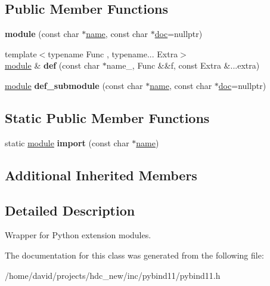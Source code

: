\subsection*{Public Member Functions}
\begin{DoxyCompactItemize}
\item 
{\bfseries module} (const char $\ast$\hyperlink{structname}{name}, const char $\ast$\hyperlink{structdoc}{doc}=nullptr)\hypertarget{classmodule_abd798017921903073343c4479efb93c0}{}\label{classmodule_abd798017921903073343c4479efb93c0}

\item 
{\footnotesize template$<$typename Func , typename... Extra$>$ }\\\hyperlink{classmodule}{module} \& {\bfseries def} (const char $\ast$name\+\_\+, Func \&\&f, const Extra \&...extra)\hypertarget{classmodule_abdc147152dd2073839cfdf1deac1dd5a}{}\label{classmodule_abdc147152dd2073839cfdf1deac1dd5a}

\item 
\hyperlink{classmodule}{module} {\bfseries def\+\_\+submodule} (const char $\ast$\hyperlink{structname}{name}, const char $\ast$\hyperlink{structdoc}{doc}=nullptr)\hypertarget{classmodule_a0e559dd7ef70d0edd90d0327ddbd0c12}{}\label{classmodule_a0e559dd7ef70d0edd90d0327ddbd0c12}

\end{DoxyCompactItemize}
\subsection*{Static Public Member Functions}
\begin{DoxyCompactItemize}
\item 
static \hyperlink{classmodule}{module} {\bfseries import} (const char $\ast$\hyperlink{structname}{name})\hypertarget{classmodule_a40817edef0ded5727701534bcded9982}{}\label{classmodule_a40817edef0ded5727701534bcded9982}

\end{DoxyCompactItemize}
\subsection*{Additional Inherited Members}


\subsection{Detailed Description}
Wrapper for Python extension modules. 

The documentation for this class was generated from the following file\+:\begin{DoxyCompactItemize}
\item 
/home/david/projects/hdc\+\_\+new/inc/pybind11/pybind11.\+h\end{DoxyCompactItemize}
